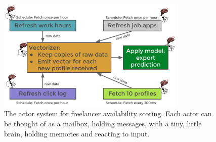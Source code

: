 \documentclass{article}
\begin{document}
\begin{figure}[h]
\includegraphics[width=0.8\textwidth]{fig/tex/availability_system.png}
\centering
\caption{The actor system for freelancer availability scoring. Each actor can be thought of
as a mailbox, holding messages, with a tiny, little brain, holding memories and reacting to 
input.}
\label{fig_av_system}
\end{figure}
\end{document}
